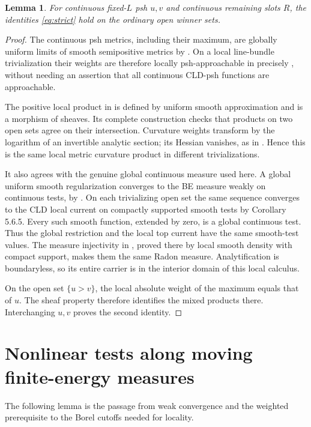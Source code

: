 \documentclass[11pt]{article}
\newtheorem{lemma}[theorem]{Lemma}
\begin{document}
\begin{lemma}\label{lem:continuous}
For continuous fixed-$L$ psh $u,v$ and continuous remaining slots
$R$, the identities \eqref{eq:strict} hold on the ordinary open
winner sets.
\end{lemma}
\begin{proof}
The continuous psh metrics, including their maximum, are globally
uniform limits of smooth semipositive metrics by
\cite[Theorem 7.14]{BE}. On a local line-bundle trivialization their
weights are therefore locally psh-approachable in precisely
\cite[Definition 5.6.3 and Section 6.3.1]{CLD}, without needing an
assertion that all continuous CLD-psh functions are approachable.

The positive local product in \cite[Corollaries 5.6.5--5.6.6]{CLD}
is defined by uniform smooth approximation and is a morphism of
sheaves. Its complete construction checks that products on two
open sets agree on their intersection. Curvature weights transform
by the logarithm of an invertible analytic section; its Hessian
vanishes, as in \cite[Section 6.4.1]{CLD}. Hence this is the same
local metric curvature product in different trivializations.

It also agrees with the genuine global continuous measure used
here. A global uniform smooth regularization converges to the BE
measure weakly on continuous tests, by \cite[Theorem 8.4]{BE}.
On each trivializing open set the same sequence converges to the
CLD local current on compactly supported smooth tests by
Corollary 5.6.5. Every such smooth function, extended by zero,
is a global continuous test. Thus the global restriction and the
local top current have the same smooth-test values. The measure
injectivity in \cite[Proposition 5.4.6]{CLD}, proved there by local
smooth density with compact support, makes them the same Radon
measure. Analytification is boundaryless, so its entire carrier is
in the interior domain of this local calculus.

On the open set $\{u>v\}$, the local absolute weight of the maximum
equals that of $u$. The sheaf property therefore identifies the
mixed products there. Interchanging $u,v$ proves the second identity.
\end{proof}

\section{Nonlinear tests along moving finite-energy measures}

The following lemma is the passage from weak convergence and the
weighted prerequisite to the Borel cutoffs needed for locality.
\end{document}

